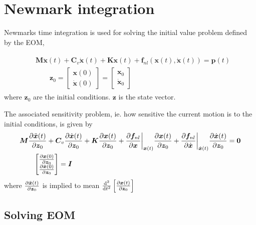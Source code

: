 
\chapter{Newmark integration}
\label{chap:newmark-integration}

Newmarks time integration is used for solving the initial value problem defined by
the EOM,

\begin{align}
  \label{eq:nm_eom}
    \begin{aligned}
  &\bm M \ddot{\bm x}(t) + \bm C_v \dot{\bm x}(t) + \bm K \bm x(t) +
    \bm f_{nl} \left( \bm x(t), \dot{ \bm x}(t) \right) = \bm p(t) \\
  &\qquad \bm z_0 =
  \begin{bmatrix}
    \bm x(0) \\
    \dot{\bm x}(0)
  \end{bmatrix}
  =
  \begin{bmatrix}
    \bm x_0 \\
    \dot{\bm x}_0
  \end{bmatrix}
\end{aligned}
\end{align}
where $\bm z_0$ are the initial conditions. $\bm z$ is the state vector.

The associated sensitivity problem, ie. how sensitive the current motion is to
the initial conditions, is given by
\begin{equation}
  \label{eq:nm_sens}
  \begin{aligned}
  &\bm M  \frac{\partial \ddot{ \bm x}(t)}{\partial \bm z_0}  +
  \bm C_v \frac{\partial \dot{\bm x}(t)}{\partial \bm z_0}  +
  \bm K \frac{\partial \bm x(t)}{\partial \bm z_0}  +
    \frac{\partial \bm f_{nl}}{\partial \bm x} \bigg|_{\bm x(t)}
    \frac{\partial \bm x(t)}{\partial \bm z_0} +
    \frac{\partial \bm f_{nl}}{\partial \dot{\bm x}} \bigg|_{\dot {\bm x}(t)}
    \frac{\partial \dot{ \bm x}(t)}{\partial \bm z_0} =
  \bm 0 \\
  &\qquad
  \begin{bmatrix}
    \frac{\partial \bm x(0)}{\partial \bm z_0} \\
    \frac{\partial \dot{\bm x}(0)}{\partial \bm z_0}
  \end{bmatrix}
  = \bm I
    \end{aligned}
\end{equation}
where $\frac{\partial \ddot{ \bm x}(t)}{\partial \bm z_0}$ is implied to mean
$\frac{\operatorname{d}\!^2}{\operatorname{d}\! t^2} \left[\frac{\partial \bm x(t)}{\partial \bm z_0} \right]$

\section{Solving EOM}
\label{sec:nm_solve_eom}


